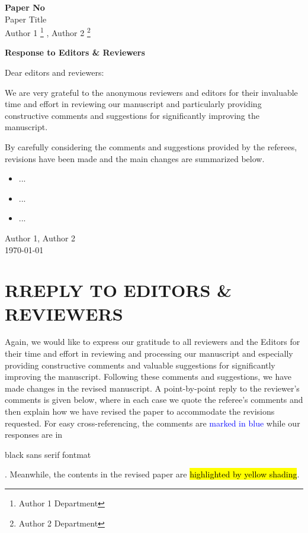 \documentclass[12pt,review]{elsarticle}
\newcounter{reviewer}
\newcounter{point}[reviewer]
\def\myauthor{Author 1 \footnote{
	Author 1 Department
}
, Author 2 \footnote{
	Author 2 Department
}} %
\def\mycoauthor{Author 1, Author 2}
\def\mytitle{Paper Title} %
\def\myarticleno{Paper No}
\def\mydate{\today} %
\begin{document}

\begin{titlepage}
\noindent \textbf{\myarticleno} \\
\mytitle \\
\myauthor
\begin{center}
  \vspace{1cm}

  \Large \textbf{Response to Editors \& Reviewers}

  \vspace{1cm}
\end{center}

\begin{tcolorbox}[title = To editors and reviewers]
Dear editors and reviewers:

\quad We are very grateful to the anonymous reviewers and editors for their invaluable time and effort in reviewing our manuscript and particularly providing constructive comments and suggestions for significantly improving the manuscript. 

\quad By carefully considering the comments and suggestions provided by the referees, revisions have been made and the main changes are summarized below.
\begin{itemize}
	\item ...
	\item ...
	\item ...
\end{itemize}
\mycoauthor \\
\mydate
\end{tcolorbox}

\end{titlepage}

\section*{RREPLY TO EDITORS \& REVIEWERS}
Again, we would like to express our gratitude to all reviewers and the Editors for their time and effort in reviewing and processing our manuscript and especially providing constructive comments and valuable suggestions for significantly improving the manuscript. Following these comments and suggestions, we have made changes in the revised manuscript. A point-by-point reply to the reviewer’s comments is given below, where in each case we quote the referee’s comments and then explain how we have revised the paper to accommodate the revisions requested. 
For easy cross-referencing, the comments are \textcolor{blue}{marked in blue} while our responses are in \begin{sf}black sans serif fontmat\end{sf}. Meanwhile, the contents in the revised paper are \hl{highlighted by yellow shading}.
\end{document}

